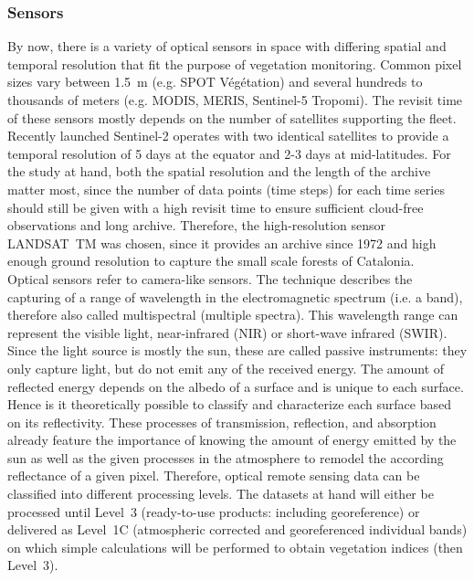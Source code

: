 \subsubsection{Sensors}
By now, there is a variety of optical sensors in space with differing spatial and temporal resolution that fit the purpose of vegetation monitoring. Common pixel sizes vary between 1.5~m (e.g. SPOT Végétation) and several hundreds to thousands of meters (e.g. MODIS, MERIS, Sentinel-5 Tropomi). The revisit time of these sensors mostly depends on the number of satellites supporting the fleet. Recently launched Sentinel-2 operates with two identical satellites to provide a temporal resolution of 5 days at the equator and 2-3 days at mid-latitudes. For the study at hand, both the spatial resolution and the length of the archive matter most, since the number of data points (time steps) for each time series should still be given with a high revisit time to ensure sufficient cloud-free observations and long archive. Therefore, the high-resolution sensor LANDSAT~TM was chosen, since it provides an archive since 1972 and high enough ground resolution to capture the small scale forests of Catalonia.\\
Optical sensors refer to camera-like sensors. The technique describes the capturing of a range of wavelength in the electromagnetic spectrum (i.e. a band), therefore also called multispectral (multiple spectra). This wavelength range can represent the visible light, near-infrared (NIR) or short-wave infrared (SWIR). Since the light source is mostly the sun, these are called passive instruments: they only capture light, but do not emit any of the received energy. %
The amount of reflected energy depends on the albedo of a surface and is unique to each surface. Hence is it theoretically possible to classify and characterize each surface based on its reflectivity.
These processes of transmission, reflection, and absorption already feature the importance of knowing the amount of energy emitted by the sun as well as the given processes in the atmosphere to remodel the according reflectance of a given pixel. Therefore, optical remote sensing data can be classified into different processing levels. The datasets at hand will either be processed until Level~3 (ready-to-use products: including georeference) or delivered as Level~1C (atmospheric corrected and georeferenced individual bands) on which simple calculations will be performed to obtain vegetation indices (then Level~3).\\

